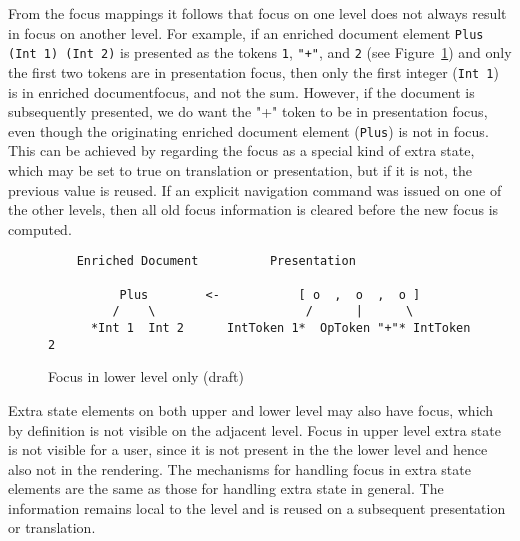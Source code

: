 From the focus mappings it follows that focus on one level does not always result in focus on another level. For example, if an enriched document element \verb|Plus (Int 1) (Int 2)| is presented as the tokens \verb|1|, \verb|"+"|, and \verb|2| (see Figure~\ref{lowerLevelFocus}) and only the first two tokens are in presentation focus, then only the first integer (\verb|Int 1|) is in enriched documentfocus, and not the sum. However, if the document is subsequently presented, we do want the "+" token to be in presentation focus, even though the originating enriched document element (\verb|Plus|) is not in focus. This can be achieved by regarding the focus as a special kind of extra state, which may be set to true on translation or presentation, but if it is not, the previous value is reused. If an explicit navigation command was issued on one of the other levels, then all old focus information is cleared before the new focus is computed. 

\begin{figure}
\begin{small}
\begin{center}
\begin{verbatim}
    Enriched Document          Presentation
    
          Plus        <-           [ o  ,  o  ,  o ]
         /    \                     /      |      \   
      *Int 1  Int 2      IntToken 1*  OpToken "+"* IntToken 2
\end{verbatim}
\caption{Focus in lower level only (draft)}\label{lowerLevelFocus} 
\end{center}
\end{small}
\end{figure}

Extra state elements on both upper and lower level may also have focus, which by definition is not visible on the adjacent level. Focus in upper level extra state is not visible for a user, since it is not present in the the lower level and hence also not in the rendering. The mechanisms for handling focus in extra state elements are the same as those for handling extra state in general. The information remains local to the level and is reused on a subsequent presentation or translation. 

